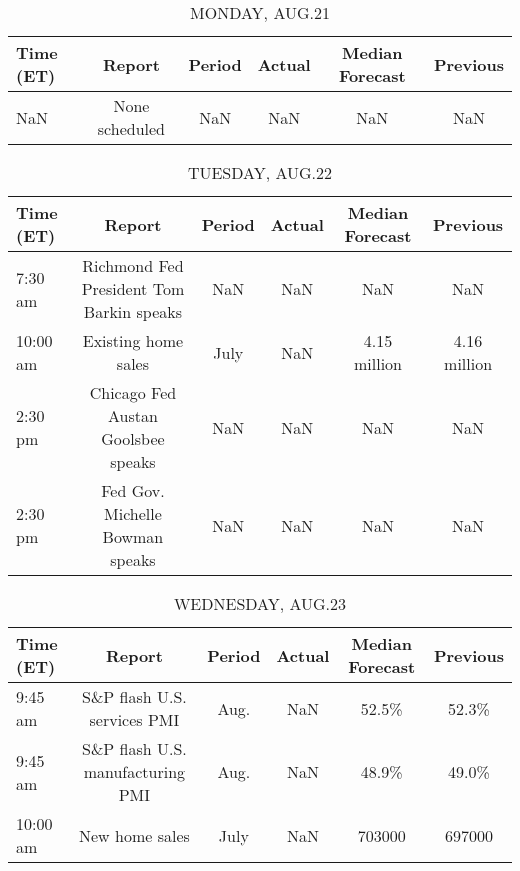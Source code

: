 \documentclass{article}%
\begin{document}
%
\normalsize%


\begin{table}[htbp]%
\caption{MONDAY, AUG.21}%
\centering%
\begin{adjustbox}{width=1\textwidth}%
\begin{tabular}{lccccc}
\toprule
Time (ET) &         Report & Period & Actual & Median Forecast & Previous \\
\midrule
      NaN & None scheduled &    NaN &    NaN &             NaN &      NaN \\
\bottomrule
\end{tabular}
%
\end{adjustbox}%
\end{table}

%


\begin{table}[htbp]%
\caption{TUESDAY, AUG.22}%
\centering%
\begin{adjustbox}{width=1\textwidth}%
\begin{tabular}{lccccc}
\toprule
Time (ET) &                                   Report & Period & Actual & Median Forecast &     Previous \\
\midrule
  7:30 am & Richmond Fed President Tom Barkin speaks &    NaN &    NaN &             NaN &          NaN \\
 10:00 am &                      Existing home sales &   July &    NaN &    4.15 million & 4.16 million \\
  2:30 pm &       Chicago Fed Austan Goolsbee speaks &    NaN &    NaN &             NaN &          NaN \\
  2:30 pm &          Fed Gov. Michelle Bowman speaks &    NaN &    NaN &             NaN &          NaN \\
\bottomrule
\end{tabular}
%
\end{adjustbox}%
\end{table}

%


\begin{table}[htbp]%
\caption{WEDNESDAY, AUG.23}%
\centering%
\begin{adjustbox}{width=1\textwidth}%
\begin{tabular}{lccccc}
\toprule
Time (ET) &                           Report & Period & Actual & Median Forecast & Previous \\
\midrule
  9:45 am &      S\&P flash U.S. services PMI &   Aug. &    NaN &           52.5\% &    52.3\% \\
  9:45 am & S\&P flash U.S. manufacturing PMI &   Aug. &    NaN &           48.9\% &    49.0\% \\
 10:00 am &                   New home sales &   July &    NaN &          703000 &   697000 \\
\bottomrule
\end{tabular}
%
\end{adjustbox}%
\end{table}
\end{document}
